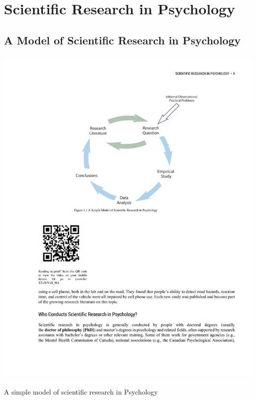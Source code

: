 \newpage
\section{Scientific Research in Psychology}

\subsection{A Model of Scientific Research in Psychology}

\begin{marginfigure}[0in]
      \includegraphics[width=\linewidth]{figures/C1Figure1.pdf}
      \caption{A simple model of scientific research in Psychology}
      \label{fig:Theresearchcycle}
\end{marginfigure}

